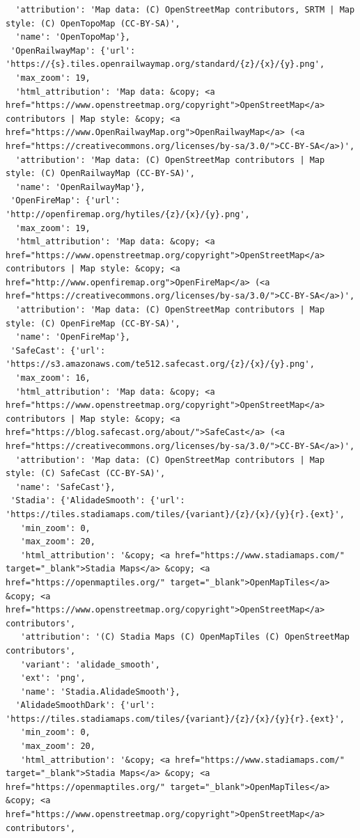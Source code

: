 \documentclass[
  letterpaper,
  DIV=11,
  numbers=noendperiod]{scrreprt}
\begin{document}
\begin{verbatim}
  'attribution': 'Map data: (C) OpenStreetMap contributors, SRTM | Map style: (C) OpenTopoMap (CC-BY-SA)',
  'name': 'OpenTopoMap'},
 'OpenRailwayMap': {'url': 'https://{s}.tiles.openrailwaymap.org/standard/{z}/{x}/{y}.png',
  'max_zoom': 19,
  'html_attribution': 'Map data: &copy; <a href="https://www.openstreetmap.org/copyright">OpenStreetMap</a> contributors | Map style: &copy; <a href="https://www.OpenRailwayMap.org">OpenRailwayMap</a> (<a href="https://creativecommons.org/licenses/by-sa/3.0/">CC-BY-SA</a>)',
  'attribution': 'Map data: (C) OpenStreetMap contributors | Map style: (C) OpenRailwayMap (CC-BY-SA)',
  'name': 'OpenRailwayMap'},
 'OpenFireMap': {'url': 'http://openfiremap.org/hytiles/{z}/{x}/{y}.png',
  'max_zoom': 19,
  'html_attribution': 'Map data: &copy; <a href="https://www.openstreetmap.org/copyright">OpenStreetMap</a> contributors | Map style: &copy; <a href="http://www.openfiremap.org">OpenFireMap</a> (<a href="https://creativecommons.org/licenses/by-sa/3.0/">CC-BY-SA</a>)',
  'attribution': 'Map data: (C) OpenStreetMap contributors | Map style: (C) OpenFireMap (CC-BY-SA)',
  'name': 'OpenFireMap'},
 'SafeCast': {'url': 'https://s3.amazonaws.com/te512.safecast.org/{z}/{x}/{y}.png',
  'max_zoom': 16,
  'html_attribution': 'Map data: &copy; <a href="https://www.openstreetmap.org/copyright">OpenStreetMap</a> contributors | Map style: &copy; <a href="https://blog.safecast.org/about/">SafeCast</a> (<a href="https://creativecommons.org/licenses/by-sa/3.0/">CC-BY-SA</a>)',
  'attribution': 'Map data: (C) OpenStreetMap contributors | Map style: (C) SafeCast (CC-BY-SA)',
  'name': 'SafeCast'},
 'Stadia': {'AlidadeSmooth': {'url': 'https://tiles.stadiamaps.com/tiles/{variant}/{z}/{x}/{y}{r}.{ext}',
   'min_zoom': 0,
   'max_zoom': 20,
   'html_attribution': '&copy; <a href="https://www.stadiamaps.com/" target="_blank">Stadia Maps</a> &copy; <a href="https://openmaptiles.org/" target="_blank">OpenMapTiles</a> &copy; <a href="https://www.openstreetmap.org/copyright">OpenStreetMap</a> contributors',
   'attribution': '(C) Stadia Maps (C) OpenMapTiles (C) OpenStreetMap contributors',
   'variant': 'alidade_smooth',
   'ext': 'png',
   'name': 'Stadia.AlidadeSmooth'},
  'AlidadeSmoothDark': {'url': 'https://tiles.stadiamaps.com/tiles/{variant}/{z}/{x}/{y}{r}.{ext}',
   'min_zoom': 0,
   'max_zoom': 20,
   'html_attribution': '&copy; <a href="https://www.stadiamaps.com/" target="_blank">Stadia Maps</a> &copy; <a href="https://openmaptiles.org/" target="_blank">OpenMapTiles</a> &copy; <a href="https://www.openstreetmap.org/copyright">OpenStreetMap</a> contributors',

\end{verbatim}
\end{document}
